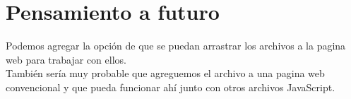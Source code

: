 \documentclass{article}
\begin{document}
\section{Pensamiento a futuro}
Podemos agregar la opción de que se puedan arrastrar los archivos a la pagina web para trabajar con ellos.\\
También sería muy probable que agreguemos el archivo a una pagina web convencional y que pueda funcionar ahí junto con otros archivos JavaScript.
\end{document}
